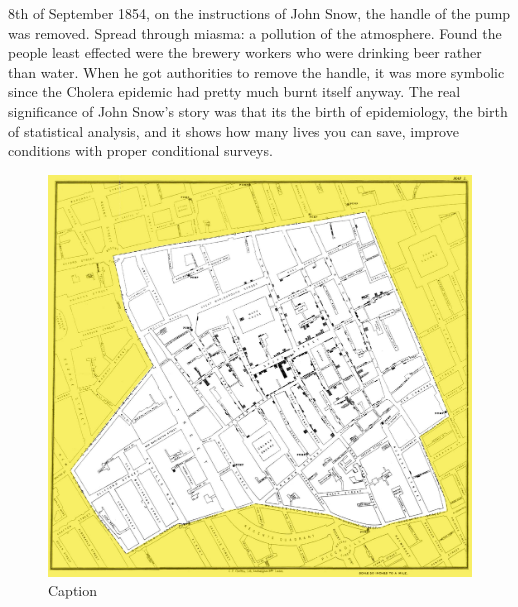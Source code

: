 \documentclass[12pt]{article}
\begin{document}
8th of September 1854, on the instructions of John Snow, the handle of the pump was removed. Spread through miasma: a pollution of the atmosphere. Found the people least effected were the brewery workers who were drinking beer rather than water. When he got authorities to remove the handle, it was more symbolic since the Cholera epidemic had pretty much burnt itself anyway. The real significance of John Snow's story was that its the birth of epidemiology, the birth of statistical analysis, and it shows how many lives you can save, improve conditions with proper conditional surveys. \cite{youtube}

\begin{figure}
\centering
\includegraphics{snowmap_1854}
\caption{Caption}
\label{fig:snow}
\end{figure}
\end{document}
